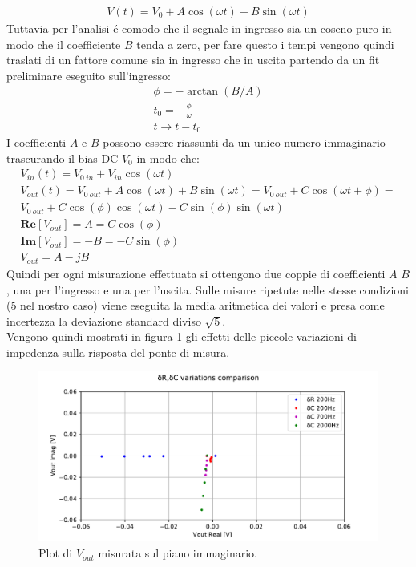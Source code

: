 \begin{gather}
	V(t)=V_0+A \cos (\omega t)+B \sin (\omega t)
\end{gather}
Tuttavia per l'analisi \'e comodo che il segnale in ingresso sia un coseno puro in modo che il coefficiente $B$ tenda a zero, per fare questo i tempi vengono quindi traslati di un fattore comune sia in ingresso che in uscita partendo da un fit preliminare eseguito sull'ingresso:
\begin{gather}
	\phi=-\arctan (B/A) \\
	t_0=-\frac{\phi}{\omega} \\
	t \rightarrow t-t_0
\end{gather}
I coefficienti $A$ e $B$ possono essere riassunti da un unico numero immaginario trascurando il bias DC $V_0$ in modo che:
\begin{gather}
	V_{in}(t)=V_{0\ in}+V_{in}\cos (\omega t) \\
	V_{out}(t)=V_{0\ out}+A\cos (\omega t)+B\sin (\omega t)= V_{0\ out}+C \cos (\omega t+\phi) =\\
	\nonumber V_{0\ out}+C\cos (\phi)\cos (\omega t) -C \sin (\phi) \sin (\omega t) \\
	\mathbf{Re}[V_{out}]=A=C\cos (\phi) \\
	\mathbf{Im}[V_{out}]=-B=-C\sin (\phi) \\
	V_{out}=A-jB
\end{gather}
Quindi per ogni misurazione effettuata si ottengono due coppie di coefficienti $A$ $B$, una per l'ingresso e una per l'uscita.
Sulle misure ripetute nelle stesse condizioni (5 nel nostro caso) viene eseguita la media aritmetica dei valori e presa come incertezza la deviazione standard diviso $\sqrt{5}$.\\
Vengono quindi mostrati in figura \ref{fig:complan} gli effetti delle piccole variazioni di impedenza sulla risposta del ponte di misura.
\begin{figure}[h]
	\centering
    \includegraphics[width=\textwidth]{Figure_7.pdf}
    
    \caption{Plot di $V_{out}$ misurata sul piano immaginario.}
    \label{fig:complan}
\end{figure}
